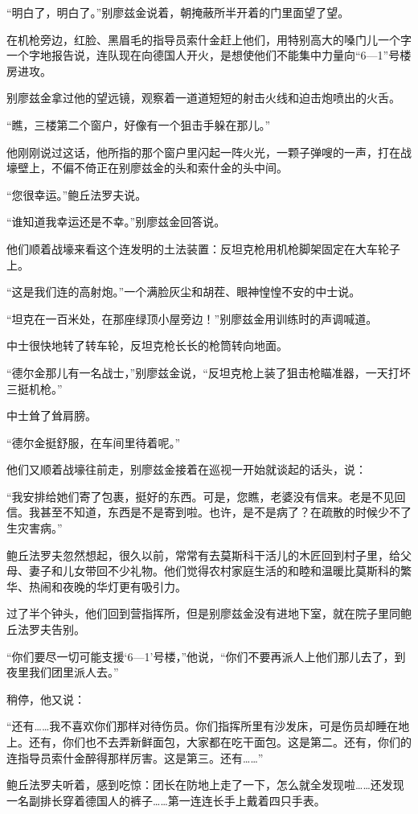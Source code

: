 “明白了，明白了。”别廖兹金说着，朝掩蔽所半开着的门里面望了望。

在机枪旁边，红脸、黑眉毛的指导员索什金赶上他们，用特别高大的嗓门儿一个字一个字地报告说，连队现在向德国人开火，是想使他们不能集中力量向“6—1”号楼房进攻。

别廖兹金拿过他的望远镜，观察着一道道短短的射击火线和迫击炮喷出的火舌。

“瞧，三楼第二个窗户，好像有一个狙击手躲在那儿。”

他刚刚说过这话，他所指的那个窗户里闪起一阵火光，一颗子弹嗖的一声，打在战壕壁上，不偏不倚正在别廖兹金的头和索什金的头中间。

“您很幸运。”鲍丘法罗夫说。

“谁知道我幸运还是不幸。”别廖兹金回答说。

他们顺着战壕来看这个连发明的土法装置：反坦克枪用机枪脚架固定在大车轮子上。

“这是我们连的高射炮。”一个满脸灰尘和胡茬、眼神惶惶不安的中士说。

“坦克在一百米处，在那座绿顶小屋旁边！”别廖兹金用训练时的声调喊道。

中士很快地转了转车轮，反坦克枪长长的枪筒转向地面。

“德尔金那儿有一名战士，”别廖兹金说，“反坦克枪上装了狙击枪瞄准器，一天打坏三挺机枪。”

中士耸了耸肩膀。

“德尔金挺舒服，在车间里待着呢。”

他们又顺着战壕往前走，别廖兹金接着在巡视一开始就谈起的话头，说：

“我安排给她们寄了包裹，挺好的东西。可是，您瞧，老婆没有信来。老是不见回信。我甚至不知道，东西是不是寄到啦。也许，是不是病了？在疏散的时候少不了生灾害病。”

鲍丘法罗夫忽然想起，很久以前，常常有去莫斯科干活儿的木匠回到村子里，给父母、妻子和儿女带回不少礼物。他们觉得农村家庭生活的和睦和温暖比莫斯科的繁华、热闹和夜晚的华灯更有吸引力。

过了半个钟头，他们回到营指挥所，但是别廖兹金没有进地下室，就在院子里同鲍丘法罗夫告别。

“你们要尽一切可能支援‘6—1’号楼，”他说，“你们不要再派人上他们那儿去了，到夜里我们团里派人去。”

稍停，他又说：

“还有……我不喜欢你们那样对待伤员。你们指挥所里有沙发床，可是伤员却睡在地上。还有，你们也不去弄新鲜面包，大家都在吃干面包。这是第二。还有，你们的连指导员索什金醉得那样厉害。这是第三。还有……”

鲍丘法罗夫听着，感到吃惊：团长在防地上走了一下，怎么就全发现啦……还发现一名副排长穿着德国人的裤子……第一连连长手上戴着四只手表。

